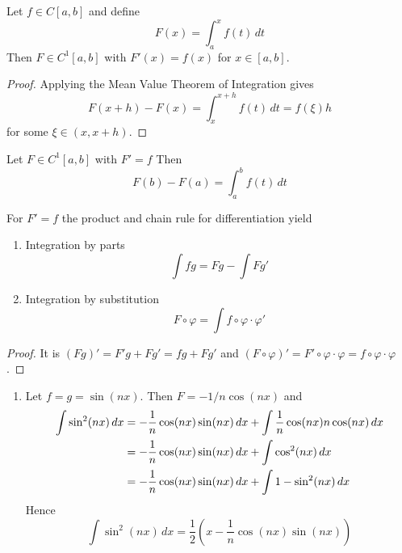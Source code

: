 \begin{theorem}\label{thm:differentiation}
    Let \( f \in C[a,b] \) and define
    \[
        F(x) = \int_a^x f(t)\,dt
    \]
    Then \( F \in C^1[a,b] \) with \( F'(x) = f(x) \) for \( x \in [a,b] \).
\end{theorem}

\begin{proof}
    Applying the Mean Value Theorem of Integration gives
    \[
        F(x + h) - F(x) =  \int_x^{x + h} f(t)\,dt = f(\xi) h
    \]
    for some \( \xi \in (x, x + h) \).
\end{proof}
\bigskip

\begin{theorem}\label{thm:fund_calculus}
    Let \( F \in C^1[a,b] \) with \( F' = f \)  Then
    \[
        F(b) -F(a) = \int_a^b f(t)\,dt
    \]
\end{theorem}
\bigskip


\begin{lemma}
    For \( F' = f \) the product and chain rule for differentiation yield
    \begin{enumerate}
        \item Integration by parts
              \[
                  \int fg = Fg - \int Fg'
              \]
        \item Integration by substitution
              \[
                  F \circ \varphi = \int f\circ \varphi \cdot\varphi'
              \]
    \end{enumerate}
\end{lemma}
\begin{proof}
    It is \( (Fg)' = F'g + Fg' = fg + Fg' \) and
    \( (F\circ \varphi)' = F'\circ \varphi \cdot\varphi = f\circ \varphi \cdot\varphi \).
\end{proof}
\bigskip


\begin{examples}\hfill
    \begin{enumerate}
        \item Let \( f = g = \sin(nx) \). Then \( F = -1/n \cos(nx) \) and
              \[
                  \begin{split}
                      \int \sin^2(nx)\,dx
                      & = -\frac{1}{n} \cos(nx)\sin(nx)\,dx + \int \frac{1}{n} \cos(nx) n \cos(nx)\,dx \\
                      & = -\frac{1}{n} \cos(nx)\sin(nx)\,dx + \int \cos^2(nx)\,dx \\
                      & = -\frac{1}{n} \cos(nx)\sin(nx)\,dx + \int 1 - \sin^2(nx)\,dx
                  \end{split}
              \]
              Hence
              \[
                  \int \sin^2(nx)\,dx = \frac{1}{2}(x - \frac{1}{n}\cos(nx)\sin(nx))
              \]
    \end{enumerate}
\end{examples}
\bigskip


